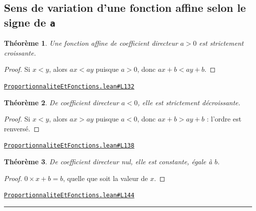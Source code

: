 \documentclass[11pt,a4paper]{article}
\theoremstyle{definition}
\theoremstyle{plain}
\newtheorem{theoreme}{Théorème}
\newcommand{\source}[2]{\par\smallskip\noindent\hfill{\footnotesize\href{#1}{\texttt{#2}}}\par\smallskip}
\begin{document}
\subsection{Sens de variation d'une fonction affine selon le signe de \texttt{a}}

\begin{theoreme}
Une fonction affine de coefficient directeur $a > 0$ est strictement croissante.
\end{theoreme}

\begin{proof}
Si $x < y$, alors $ax < ay$ puisque $a > 0$, donc $ax + b < ay + b$.
\end{proof}
\source{https://github.com/Commutator-IO/learn-lean/blob/main/courses/01-college/05-proportionnalite-et-fonctions/ProportionnaliteEtFonctions.lean\#L132}{ProportionnaliteEtFonctions.lean\#L132}

\begin{theoreme}
De coefficient directeur $a < 0$, elle est strictement décroissante.
\end{theoreme}

\begin{proof}
Si $x < y$, alors $ax > ay$ puisque $a < 0$, donc $ax + b > ay + b$ : l'ordre est
renversé.
\end{proof}
\source{https://github.com/Commutator-IO/learn-lean/blob/main/courses/01-college/05-proportionnalite-et-fonctions/ProportionnaliteEtFonctions.lean\#L138}{ProportionnaliteEtFonctions.lean\#L138}

\begin{theoreme}
De coefficient directeur nul, elle est constante, égale à $b$.
\end{theoreme}

\begin{proof}
$0 \times x + b = b$, quelle que soit la valeur de $x$.
\end{proof}
\source{https://github.com/Commutator-IO/learn-lean/blob/main/courses/01-college/05-proportionnalite-et-fonctions/ProportionnaliteEtFonctions.lean\#L144}{ProportionnaliteEtFonctions.lean\#L144}

\vfill
\noindent\rule{0.35\linewidth}{0.4pt}\par
{}
\end{document}
